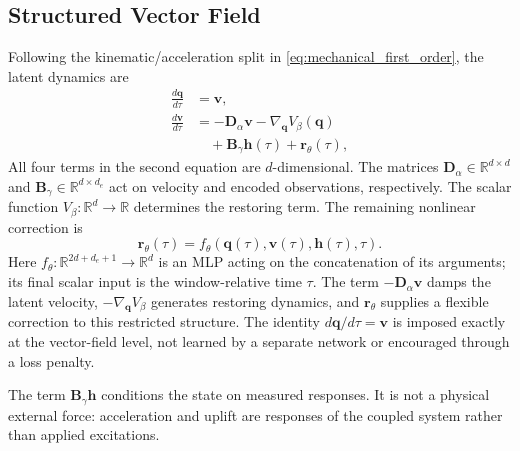 \documentclass[journal,twoside]{IEEEtran}
\begin{document}
\subsection{Structured Vector Field}
\label{subsec:physics_guided}
Following the kinematic/acceleration split in
\eqref{eq:mechanical_first_order}, the latent dynamics are
\begin{equation}
\begin{aligned}
    \frac{d\mathbf q}{d\tau}&=\mathbf v,\\
    \frac{d\mathbf v}{d\tau}&=-\mathbf D_\alpha\mathbf v
    -\nabla_{\mathbf q}V_\beta(\mathbf q)\\
    &\quad+\mathbf B_\gamma\mathbf h(\tau)
    +\mathbf r_\theta(\tau),
\end{aligned}
\label{eq:final_pgnd}
\end{equation}
All four terms in the second equation are $d$-dimensional.
The matrices $\mathbf D_\alpha\in\mathbb R^{d\times d}$ and
$\mathbf B_\gamma\in\mathbb R^{d\times d_e}$ act on velocity and encoded
observations, respectively. The scalar function
$V_\beta:\mathbb R^d\to\mathbb R$ determines the restoring term.
The remaining nonlinear correction is
\begin{equation}
    \mathbf r_\theta(\tau)=f_\theta
    (\mathbf q(\tau),\mathbf v(\tau),\mathbf h(\tau),\tau).
    \label{eq:neural_residual}
\end{equation}
Here $f_\theta:\mathbb R^{2d+d_e+1}\to\mathbb R^d$ is an MLP acting
on the concatenation of its arguments; its final scalar input is the
window-relative time $\tau$. The term $-\mathbf D_\alpha\mathbf v$
damps the latent velocity, $-\nabla_{\mathbf q}V_\beta$ generates
restoring dynamics, and $\mathbf r_\theta$ supplies a flexible correction
to this restricted structure. The identity $d\mathbf q/d\tau=\mathbf v$
is imposed exactly at the vector-field level, not learned by a separate
network or encouraged through a loss penalty.

The term $\mathbf B_\gamma\mathbf h$ conditions the state on measured
responses. It is not a physical external force: acceleration and uplift
are responses of the coupled system rather than applied excitations.
\end{document}
